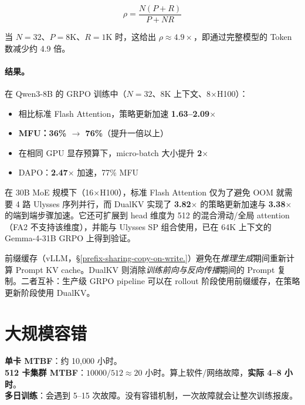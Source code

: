 \begin{equation}
\rho = \frac{N(P+R)}{P+NR}
\end{equation}

当 $N=32$、$P=8\text{K}$、$R=1\text{K}$ 时，这给出 $\rho \approx 4.9\times$，即通过完整模型的 Token 数减少约 4.9 倍。

\paragraph{结果。}
在 Qwen3-8B 的 GRPO 训练中（$N=32$、8K 上下文、8$\times$H100）：

\begin{itemize}
  \item 相比标准 Flash Attention，策略更新加速 \textbf{1.63--2.09$\times$}
  \item \textbf{MFU：36\% $\to$ 76\%}（提升一倍以上）
  \item 在相同 GPU 显存预算下，micro-batch 大小提升 \textbf{2$\times$}
  \item DAPO：\textbf{2.47$\times$} 加速，77\% MFU
\end{itemize}

在 30B MoE 规模下（16$\times$H100），标准 Flash Attention 仅为了避免 OOM 就需要 4 路 Ulysses 序列并行，而 DualKV 实现了 \textbf{3.82$\times$} 的策略更新加速与 \textbf{3.38$\times$} 的端到端步骤加速。它还可扩展到 head 维度为 512 的混合滑动/全局 attention（FA2 不支持该维度），并能与 Ulysses SP 组合使用，已在 64K 上下文的 Gemma-4-31B GRPO 上得到验证。

\begin{intuitionbox}
前缀缓存（vLLM，§\ref{prefix-sharing-copy-on-write.}）避免在\emph{推理生成}期间重新计算 Prompt KV cache。DualKV 则消除\emph{训练前向与反向传播}期间的 Prompt 复制。二者互补：生产级 GRPO pipeline 可以在 rollout 阶段使用前缀缓存，在策略更新阶段使用 DualKV。
\end{intuitionbox}

\section{大规模容错}
\label{fault-tolerance-at-scale}

\begin{warningbox}[硬件故障现实]
\textbf{单卡 MTBF}：约 10,000 小时。\\
\textbf{512 卡集群 MTBF}：$10000/512 \approx 20$ 小时。算上软件/网络故障，\textbf{实际 4--8 小时}。\\
\textbf{多日训练}：会遇到 5--15 次故障。没有容错机制，一次故障就会让整次训练报废。
\end{warningbox}

